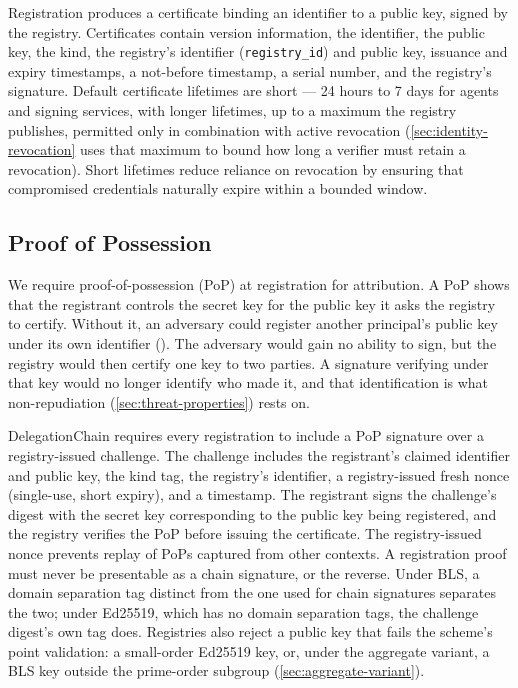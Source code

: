 \documentclass[11pt,a4paper]{article}
\begin{document}
Registration produces a certificate binding an identifier to a public
key, signed by the registry. Certificates contain version
information, the identifier, the public key, the kind, the registry's
identifier (\texttt{registry\_id}) and public key, issuance and expiry
timestamps, a
not-before timestamp, a serial number, and the registry's signature.
Default certificate lifetimes are short --- 24 hours to 7 days for
agents and signing services, with longer lifetimes, up to a maximum the
registry publishes, permitted only in combination with active revocation
(\cref{sec:identity-revocation} uses that maximum to bound how long a
verifier must retain a revocation).
Short lifetimes reduce reliance on revocation by ensuring that
compromised credentials naturally expire within a bounded window.

\subsection{Proof of Possession}
\label{sec:identity-pop}

We require proof-of-possession (PoP) at registration for attribution. A
PoP shows that the registrant controls the secret key for the public key
it asks the registry to certify. Without it, an adversary could register
another principal's public key under its own identifier
(). The adversary would gain no ability to sign, but the
registry would then certify one key to two parties. A signature
verifying under that key would no longer identify who made it, and
that identification is what non-repudiation
(\cref{sec:threat-properties}) rests on.

DelegationChain requires every registration to include a PoP signature
over a registry-issued challenge. The challenge includes the
registrant's claimed identifier and public key, the kind tag, the
registry's identifier, a registry-issued fresh nonce (single-use,
short expiry), and a timestamp. The registrant signs the challenge's
digest with the secret key corresponding to the public key being
registered, and the registry verifies the PoP before issuing the
certificate. The registry-issued nonce prevents replay of PoPs captured
from other contexts. A registration proof must never be presentable as
a chain signature, or the reverse. Under BLS, a domain separation tag
distinct from the one used for chain signatures separates the two; under
Ed25519, which has no domain separation tags, the challenge digest's own
tag does. Registries also reject a public key that fails the scheme's
point validation: a small-order Ed25519 key, or, under the aggregate
variant, a BLS key outside the prime-order subgroup
(\cref{sec:aggregate-variant}).
\end{document}
